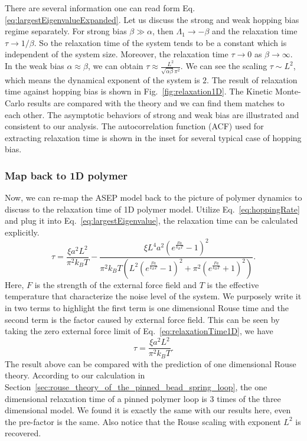 There are several information one can read form Eq.  \eqref{eq:largestEigenvalueExpanded}. Let us discuss the strong and weak hopping bias regime separately. 
For strong bias $\beta \gg \alpha$, then $\Lambda_1 \rightarrow -\beta$ and the relaxation time $\tau \rightarrow 1/\beta$. So the relaxation time of the system tends to be a constant which is independent of the system size. Moreover, the relaxation time $\tau\rightarrow 0 $ as $\beta\rightarrow\infty$.
In the weak bias $\alpha \approx \beta$, we can obtain $\tau \approx \frac{L^2}{\sqrt{\alpha\beta}\pi^2}$. We can see the scaling $\tau \sim L^2$, which means the dynamical exponent of the system is $2$. 
The result of relaxation time against hopping bias is shown in Fig.~\ref{fig:relaxation1D}. The Kinetic Monte-Carlo results are compared with the theory and we can find them matches to each other. The asymptotic behaviors of strong and weak bias are illustrated and consistent to our analysis. The autocorrelation function (ACF) used for extracting relaxation time is shown in the inset for several typical case of hopping bias.

\subsubsection{Map back to 1D polymer}
\label{ssub:Map back to 1D polymer}

Now, we can re-map the ASEP model back to the picture of polymer dynamics to discuss to the relaxation time of 1D polymer model. Utilize Eq.~\eqref{eq:hoppingRate} and plug it into Eq.~\eqref{eq:largestEigenvalue}, the relaxation time can be calculated explicitly. 
\begin{equation}
    \label{eq:relaxationTime1D}
    \tau = \frac{\xi a^2 L^2}{\pi^2 k_{B} T} - \frac{\xi L^4 a^2 \left(e^{\frac{F a}{k_{B} T}} - 1\right)^2} {\pi^2 k_{B} T \left(L^2 \left(e^{\frac{F a}{k_{B}T}} - 1\right)^2 + \pi^2 \left(e^{\frac{F a}{k_{B}T}} + 1\right)^2\right)}.
\end{equation}
Here, $F$ is the strength of the external force field and $T$ is the effective temperature that characterize the noise level of the system. We purposely write it in two terms to highlight the first term is one dimensional Rouse time and the second term is the factor caused by external force field. This can be seen by taking the zero external force limit of Eq.~\eqref{eq:relaxationTime1D}, we have
\begin{equation}
    \label{eq:relaxationTime1DnoForce}
    \tau = \frac{\xi a^2 L^2}{\pi^2 k_B T}.
\end{equation}
The result above can be compared with the prediction of one dimensional Rouse theory. According to our calculation in Section~\ref{sec:rouse_theory_of_the_pinned_bead_spring_loop}, the one dimensional relaxation time of a pinned polymer loop is $3$ times of the three dimensional model. We found it is exactly the same with our results here, even the pre-factor is the same. Also notice that the Rouse scaling with exponent $L^2$ is recovered. 

